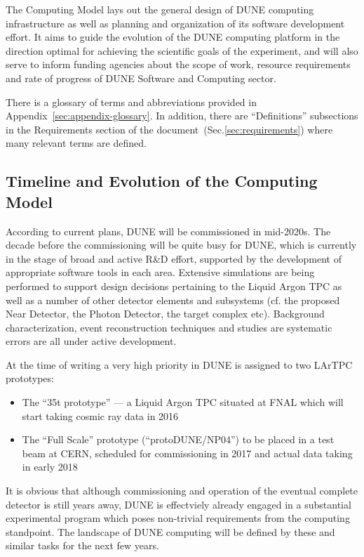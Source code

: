 The Computing Model lays out the general design of DUNE computing infrastructure as well as planning and
organization of its software development effort. It aims to guide the evolution of the DUNE computing
platform in the direction optimal for achieving the scientific goals of the experiment, and will also serve
to inform funding agencies about the scope of work, resource requirements and rate of progress of 
DUNE Software and Computing sector.

There is a glossary of terms and abbreviations provided in Appendix~\ref{sec:appendix-glossary}. In addition,
there are ``Definitions'' subsections in the Requirements section of the document~(Sec.\ref{sec:requirements}) where
many relevant terms are defined.

\subsection{Timeline and Evolution of the Computing Model}
According to current plans, DUNE will be commissioned in mid-2020s. The decade before the commissioning will be quite busy
for DUNE, which is currently in the stage of broad and active R\&D effort, supported by the development of appropriate 
software tools in each area. Extensive simulations are being performed to support design decisions pertaining to the Liquid 
Argon TPC as well as a number of other detector elements and subsystems (cf. the proposed Near Detector, the Photon Detector, 
the target complex etc). Background characterization, event reconstruction techniques and studies are systematic errors are all under active development.

At the time of writing a very high priority in DUNE is assigned to two LArTPC prototypes:
\begin{itemize}
\item The ``35t prototype'' --- a Liquid Argon TPC situated at FNAL which will start taking cosmic ray data in 2016
\item The ``Full Scale'' prototype (``protoDUNE/NP04'') to be placed in a test beam at CERN, scheduled for commissioning in 2017 and actual data taking in early 2018
\end{itemize}
\noindent
It is obvious that although commissioning and operation of the eventual complete detector is still years away, DUNE is effectviely
already engaged in a substantial experimental program which poses non-trivial requirements from the computing standpoint. The
landscape of DUNE computing will be defined by these and similar tasks for the next few years.

